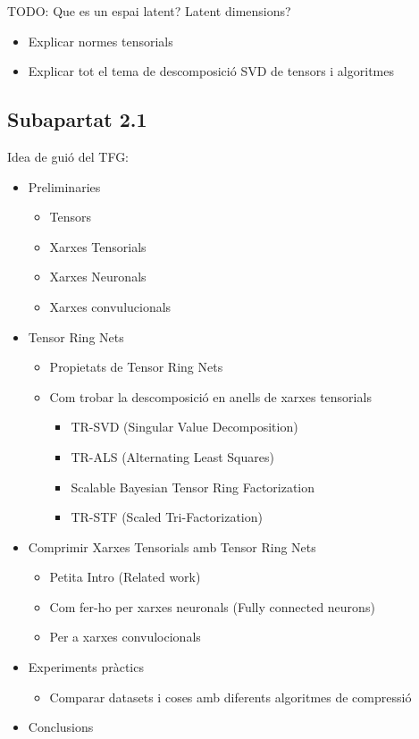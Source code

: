 \documentclass[11pt,a4paper,openright,oneside]{book}
\numberwithin{equation}{section}
\begin{document}
\newpage

TODO: Que es un espai latent? Latent dimensions?
\begin{itemize}
    \item Explicar normes tensorials
 \item Explicar tot el tema de descomposició SVD de tensors i algoritmes
\end{itemize}




\subsection{Subapartat 2.1}

Idea de guió del TFG:

\begin{itemize}
    \item Preliminaries
    \begin{itemize}
        \item Tensors
        \item Xarxes Tensorials
        \item Xarxes Neuronals
        \item Xarxes convulucionals
    \end{itemize}
    \item Tensor Ring Nets
    \begin{itemize}
        \item Propietats de Tensor Ring Nets
        \item Com trobar la descomposició en anells de xarxes tensorials
        \begin{itemize}
            \item TR-SVD (Singular Value Decomposition)
            \item TR-ALS (Alternating Least Squares)
            \item Scalable Bayesian Tensor Ring Factorization
            \item TR-STF (Scaled Tri-Factorization) 
        \end{itemize}
    \end{itemize}
    \item Comprimir Xarxes Tensorials amb Tensor Ring Nets
        \begin{itemize}
            \item Petita Intro (Related work) \cite{obukhovTBasisCompactRepresentation2021}
            \item Com fer-ho per xarxes neuronals (Fully connected neurons)
            \item Per a xarxes convulocionals
        \end{itemize}
    \item Experiments pràctics
    \begin{itemize}
        \item Comparar datasets i coses amb diferents algoritmes de compressió
    \end{itemize}
    \item Conclusions
\end{itemize}
\end{document}
